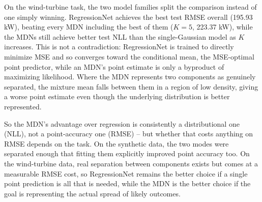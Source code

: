 On the wind-turbine task, the two model families split the comparison instead of one simply winning.
RegressionNet achieves the best test RMSE overall (195.93 kW), beating every MDN including the best of them ($K=5$, 223.37 kW), while the MDNs still achieve better test NLL than the single-Gaussian model as $K$ increases.
This is not a contradiction: RegressionNet is trained to directly minimize MSE and so converges toward the conditional mean, the MSE-optimal point predictor, while an MDN's point estimate is only a byproduct of maximizing likelihood.
Where the MDN represents two components as genuinely separated, the mixture mean falls between them in a region of low density, giving a worse point estimate even though the underlying distribution is better represented.

So the MDN's advantage over regression is consistently a distributional one (NLL), not a point-accuracy one (RMSE) -- but whether that costs anything on RMSE depends on the task.
On the synthetic data, the two modes were separated enough that fitting them explicitly improved point accuracy too.
On the wind-turbine data, real separation between components exists but comes at a measurable RMSE cost, so RegressionNet remains the better choice if a single point prediction is all that is needed, while the MDN is the better choice if the goal is representing the actual spread of likely outcomes.
